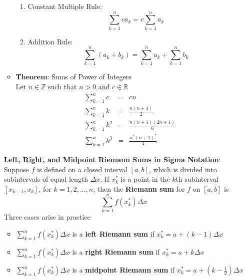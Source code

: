 \documentclass{article}
\begin{document}
\begin{itemize}
\begin{itemize}
                \begin{enumerate}
                    \item Constant Multiple Rule:
                        $$\sum_{k = 1}^{n}{ca_k} = c\sum_{k = 1}^{n}{a_k}$$
                    \item Addition Rule:
                        $$\sum_{k = 1}^{n}{\left(a_k + b_k\right)} = \sum_{k = 1}^{n}{a_k} + \sum_{k = 1}^{n}{b_k}$$
                \end{enumerate}
            \item \textbf{Theorem}: Sums of Power of Integers \\
                Let $n \in \mathbb{Z}$ such that $n > 0$ and $c \in \mathbb{R}$
                \begin{eqnarray}
                    \sum_{k = 1}^{n}{c} &=& cn \\
                    \sum_{k = 1}^{n}{k} &=& \frac{n\left(n + 1\right)}{2} \\
                    \sum_{k = 1}^{n}{k^2} &=& \frac{n\left(n + 1\right)\left(2n + 1\right)}{6} \\
                    \sum_{k = 1}^{n}{k^3} &=& \frac{n^2\left(n + 1\right)^2}{4}
                \end{eqnarray}
        \end{itemize}
    \textbf{Left, Right, and Midpoint Riemann Sums in Sigma Notation}: \\
        Suppose $f$ is defined on a closed interval $[a,b]$, which is divided into subintervals of equal length $\Delta{x}$. If $x_k^*$ is a point in the $k$th subinterval $[x_{k - 1}, x_k]$, for $k = 1,2,...,n$, then the \textbf{Riemann sum} for $f$ on $[a,b]$ is $$\sum_{k = 1}^{n}{f(x_k^*)\Delta{x}}$$
        Three cases arise in practice
    \begin{itemize}
        \item $\sum\limits_{k = 1}^{n}{f(x_k^*)\Delta{x}}$ is a \textbf{left Riemann sum} if $x_k^* = a + (k - 1)\Delta{x}$
        \item $\sum\limits_{k = 1}^{n}{f(x_k^*)\Delta{x}}$ is a \textbf{right Riemann sum} if $x_k^* = a + k\Delta{x}$
        \item $\sum\limits_{k = 1}^{n}{f(x_k^*)\Delta{x}}$ is a \textbf{midpoint Riemann sum} if $x_k^* = a + (k - \frac{1}{2})\Delta{x}$
    \end{itemize}
\end{itemize}
\end{document}
